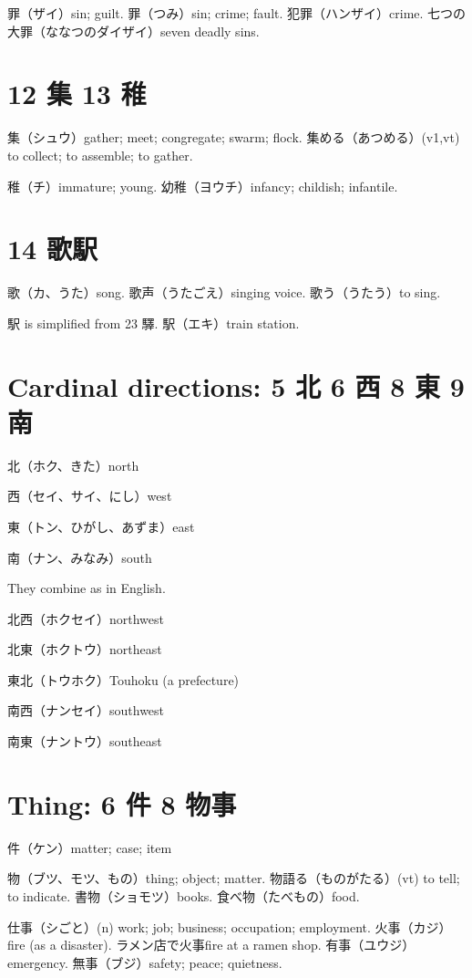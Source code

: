 罪（ザイ）sin; guilt.
罪（つみ）sin; crime; fault.
犯罪（ハンザイ）crime.
七つの大罪（ななつのダイザイ）seven deadly sins.

\section{12 集 13 稚}

集（シュウ）gather; meet; congregate; swarm; flock.
集める（あつめる）(v1,vt) to collect; to assemble; to gather.

稚（チ）immature; young.
幼稚（ヨウチ）infancy; childish; infantile.

\section{14 歌駅}

歌（カ、うた）song.
歌声（うたごえ）singing voice.
歌う（うたう）to sing.

駅 is simplified from 23 驛.
駅（エキ）train station.

\section{Cardinal directions: 5 北 6 西 8 東 9 南}

北（ホク、きた）north

西（セイ、サイ、にし）west

東（トン、ひがし、あずま）east

南（ナン、みなみ）south

They combine as in English.

北西（ホクセイ）northwest

北東（ホクトウ）northeast

東北（トウホク）Touhoku (a prefecture)

南西（ナンセイ）southwest

南東（ナントウ）southeast

\section{Thing: 6 件 8 物事}

件（ケン）matter; case; item

物（ブツ、モツ、もの）thing; object; matter.
物語る（ものがたる）(vt) to tell; to indicate.
書物（ショモツ）books.
食べ物（たべもの）food.

仕事（シごと）(n) work; job; business; occupation; employment.
火事（カジ）fire (as a disaster).
ラメン店で火事fire at a ramen shop.
有事（ユウジ）emergency.
無事（ブジ）safety; peace; quietness.

